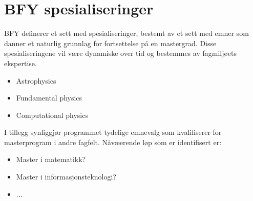 \chapter{BFY spesialiseringer}
\label{c:bfy-spec}

BFY definerer et sett med spesialiseringer, bestemt av et sett med emner som danner et naturlig grunnlag for fortsettelse på en mastergrad. Disse spesialiseringene vil være dynamiske over tid og bestemmes av fagmiljøets ekspertise.

\begin{itemize}
	\item Astrophysics
	\item Fundamental physics
	\item Computational physics
\end{itemize}

I tillegg synliggjør programmet tydelige emnevalg som kvalifiserer for masterprogram i andre fagfelt. Nåvæerende løp som er identifisert er:

\begin{itemize}
	\item Master i matematikk?
	\item Master i informasjonsteknologi?
	\item ...
\end{itemize}